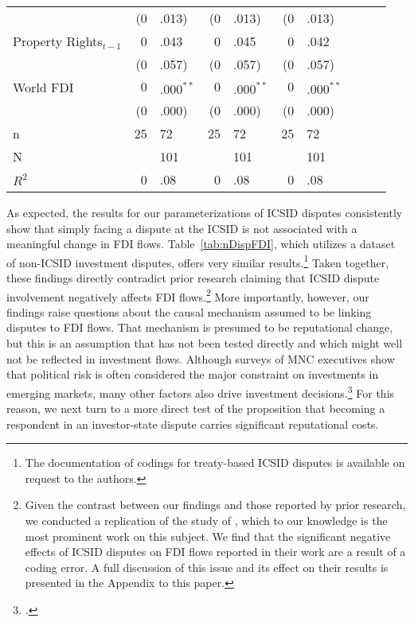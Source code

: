 \documentclass[12pt,onesided]{amsart}
\begin{document}
\begin{table}[ht]
{\begin{tabular}{lr@{} lr@{}lr@{}lr@{}lr@{}}
   & (0&.013) & (0&.013) & (0&.013) \\ 
  Property Rights$_{t-1}$ & 0&.043 & 0&.045 & 0&.042 \\ 
   & (0&.057) & (0&.057) & (0&.057) \\ 
  World FDI & $0$&$.000^{\ast\ast}$ & $0$&$.000^{\ast\ast}$ & $0$&$.000^{\ast\ast}$ \\ 
   & (0&.000) & (0&.000) & (0&.000) \\ 
   \hline
n & 25&72 & 25&72 & 25&72 \\ 
  N && 101 && 101 && 101 \\ 
  $R^{2}$ & 0&.08 & 0&.08 & 0&.08 \\ 
   \hline
\hline
\end{tabular}
}
\end{table}

As expected, the results for our parameterizations of ICSID disputes consistently show that simply facing a dispute at the ICSID is not associated with a meaningful change in FDI flows. Table~\ref{tab:nDispFDI}, which utilizes a dataset of non-ICSID investment disputes, offers very similar results.\footnote{The documentation of codings for treaty-based ICSID disputes is available on request to the authors.}  Taken together, these findings directly contradict prior research claiming that ICSID dispute involvement negatively affects FDI flows.\footnote{Given the contrast between our findings and those reported by prior research, we conducted a replication of the study of \citet{allee:peinhardt:2011}, which to our knowledge is the most prominent work on this subject. We find that the significant negative effects of ICSID disputes on FDI flows reported in their work are a result of a coding error. A full discussion of this issue and its effect on their results is presented in the Appendix to this paper.} More importantly, however, our findings raise questions about the causal mechanism assumed to be linking disputes to FDI flows. That mechanism is presumed to be reputational change, but this is an assumption that has not been tested directly and which might well not be reflected in investment flows. Although surveys of MNC executives show that political risk is often considered the major constraint on investments in emerging markets, many other factors also drive investment decisions.\footnote{\citet{miga:2011}.} For this reason, we next turn to a more direct test of the proposition that becoming a respondent in an investor-state dispute carries significant reputational costs.
\end{document}
